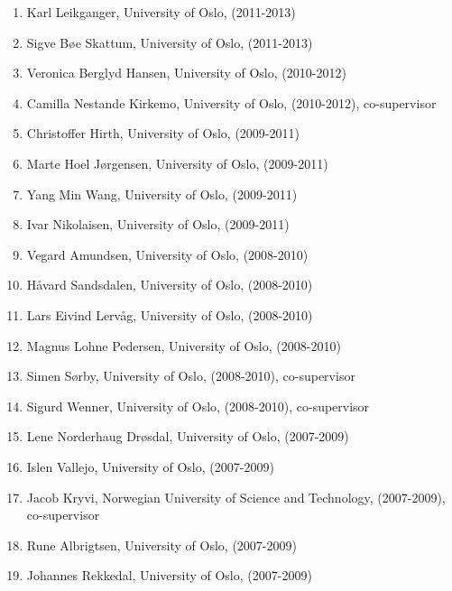 \documentclass[a4wide,10pt]{article}
\begin{document}
\begin{enumerate}
\item Karl Leikganger, University of Oslo, (2011-2013)

\item Sigve Bøe Skattum, University of Oslo, (2011-2013)

\item Veronica Berglyd Hansen, University of Oslo, (2010-2012)

\item Camilla Nestande Kirkemo, University of Oslo, (2010-2012), co-supervisor

\item Christoffer Hirth, University of Oslo, (2009-2011)

\item Marte Hoel Jørgensen, University of Oslo, (2009-2011)

\item Yang Min Wang, University of Oslo, (2009-2011)

\item Ivar Nikolaisen, University of Oslo, (2009-2011)

\item Vegard Amundsen, University of Oslo, (2008-2010)

\item Håvard Sandsdalen, University of Oslo, (2008-2010)

\item Lars Eivind Lervåg, University of Oslo, (2008-2010)

\item Magnus Lohne Pedersen, University of Oslo, (2008-2010)

\item Simen Sørby, University of Oslo, (2008-2010), co-supervisor

\item Sigurd Wenner, University of Oslo, (2008-2010), co-supervisor

\item Lene Norderhaug Drøsdal, University of Oslo, (2007-2009)

\item Islen Vallejo, University of Oslo, (2007-2009)

\item Jacob Kryvi, Norwegian University of Science and Technology, (2007-2009), co-supervisor

\item Rune Albrigtsen, University of Oslo, (2007-2009)

\item Johannes Rekkedal, University of Oslo, (2007-2009)


\end{enumerate}
\end{document}
